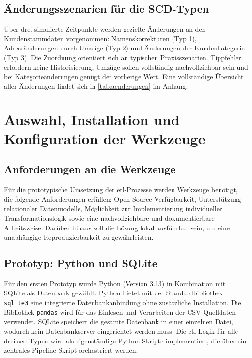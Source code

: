 \documentclass[a4paper,11pt]{article}
\begin{document}
\subsection{Änderungsszenarien für die SCD-Typen}
Über drei simulierte Zeitpunkte werden gezielte Änderungen an den Kundenstammdaten vorgenommen: Namenskorrekturen (Typ 1), 
Adressänderungen durch Umzüge (Typ 2) und Änderungen der Kundenkategorie (Typ 3). Die Zuordnung orientiert sich an typischen
 Praxisszenarien. Tippfehler erfordern keine Historisierung, Umzüge sollen vollständig nachvollziehbar sein und bei Kategorieänderungen 
 genügt der vorherige Wert. Eine vollständige Übersicht aller Änderungen findet sich in \cref{tab:aenderungen} im Anhang.

\section{Auswahl, Installation und Konfiguration der Werkzeuge}

\subsection{Anforderungen an die Werkzeuge}
Für die prototypische Umsetzung der \gls{etl}-Prozesse werden Werkzeuge benötigt, die folgende Anforderungen erfüllen: 
Open-Source-Verfügbarkeit, Unterstützung relationaler Datenmodelle, Möglichkeit zur Implementierung individueller Transformationslogik 
sowie eine nachvollziehbare und dokumentierbare Arbeitsweise. Darüber hinaus soll die Lösung lokal ausführbar sein, um 
eine unabhängige Reproduzierbarkeit zu gewährleisten.

\subsection{Prototyp: Python und SQLite}
Für den ersten Prototyp wurde Python (Version 3.13) in Kombination mit SQLite als Datenbank gewählt.
 Python bietet mit der Standardbibliothek \texttt{sqlite3} eine integrierte Datenbankanbindung ohne zusätzliche Installation. 
 Die Bibliothek \texttt{pandas} wird für das Einlesen und Verarbeiten der CSV-Quelldaten verwendet. 
 SQLite speichert die gesamte Datenbank in einer einzelnen Datei, wodurch kein Datenbankserver eingerichtet werden muss. 
 Die \gls{etl}-Logik für alle drei \gls{scd}-Typen wird als eigenständige Python-Skripte implementiert, 
 die über ein zentrales Pipeline-Skript orchestriert werden.
\end{document}
